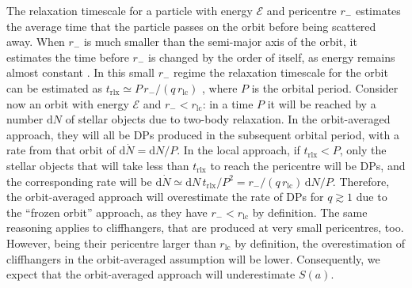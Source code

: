 \documentclass[desactivate]{aa}
\begin{document}
        The relaxation timescale for a particle with energy $\mathcal{E}$ and pericentre $r_-$ estimates the average time that the particle passes on the orbit before being scattered away. When $r_-$ is much smaller than the semi-major axis of the orbit, it estimates the time before $r_-$ is changed by the order of itself, as energy remains almost constant \citep{1978ApJ...226.1087C}. In this small $r_-$ regime the relaxation timescale for the orbit can be estimated as $t_\mathrm{rlx} \simeq P\,r_-/(q\,r_\mathrm{lc})$ \citep{2013degn.book.....M,2023MNRAS.524.3026B,2024OJAp....7E..48B}, where $P$ is the orbital period.
        Consider now an orbit with energy $\mathcal{E}$ and $r_-<r_\mathrm{lc}$: in a time $P$ it will be reached by a number $\mathrm{d}N$ of stellar objects due to two-body relaxation. In the orbit-averaged approach, they will all be DPs produced in the subsequent orbital period, with a rate from that orbit of $\mathrm{d}\dot{N} = \mathrm{d}N/P$. In the local approach, if $t_\mathrm{rlx}<P$, only the stellar objects that will take less than $t_\mathrm{rlx}$ to reach the pericentre will be DPs, and the corresponding rate will be $\mathrm{d} \dot{N} \simeq \mathrm{d}N \,t_\mathrm{rlx}/P^2 = r_- / (q\,r_\mathrm{lc})\, \mathrm{d}N / P$. Therefore, the orbit-averaged approach will overestimate the rate of DPs for $q\gtrsim 1$ due to the ``frozen orbit'' approach, as they have $r_-< r_\mathrm{lc}$ by definition. The same reasoning applies to cliffhangers, that are produced at very small pericentres, too. However, being their pericentre larger than $r_\mathrm{lc}$ by definition, the overestimation of cliffhangers in the orbit-averaged assumption will be lower. Consequently, we expect that the orbit-averaged approach will underestimate $S(a)$.
        
\end{document}
